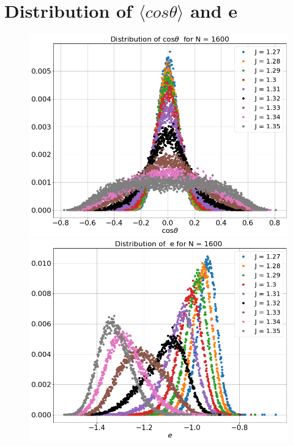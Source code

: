 \section{Distribution of $\langle cos \theta \rangle$ and e}
  \begin{figure}[H]
 	\centering
 	\includegraphics[scale=0.25]{Images/distr_cos_1600.png}
 	\includegraphics[scale=0.25]{Images/distr_energy_1600.png} \\

\end{figure}
